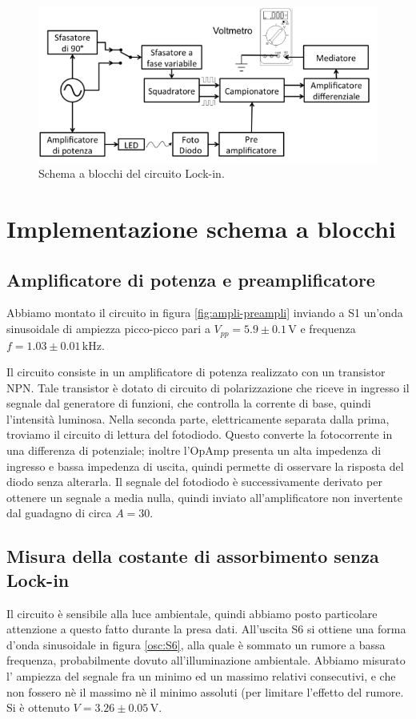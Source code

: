 \documentclass[10pt,a4paper]{article}
\begin{document}
\begin{figure}[!htb]
  \centering
  \includegraphics[scale=0.75]{schemablocchi.png}
\caption{Schema a blocchi del circuito Lock-in.\label{fig:schemablocchi}}
\end{figure}


\section{Implementazione schema a blocchi}

\subsection{Amplificatore di potenza e preamplificatore}
Abbiamo montato il circuito in figura \ref{fig:ampli-preampli} inviando a S1 un'onda sinusoidale di ampiezza picco-picco pari a $V_{pp}= 5.9\pm0.1 \,\mbox{V}$ e frequenza $f=1.03\pm0.01\,\mbox{kHz}$. 

Il circuito consiste in un amplificatore di potenza realizzato con un transistor NPN. Tale transistor è
dotato di circuito di polarizzazione che riceve in ingresso il segnale dal generatore di funzioni, che controlla la corrente di base, quindi l'intensità luminosa. Nella seconda parte, elettricamente separata dalla prima, troviamo il  circuito di lettura del fotodiodo. Questo converte la fotocorrente in una differenza di potenziale; inoltre  l'OpAmp presenta un alta impedenza di ingresso e bassa impedenza di uscita, quindi permette di osservare la risposta del diodo senza alterarla.%
Il segnale del fotodiodo è successivamente derivato per ottenere un segnale a media nulla, quindi inviato all'amplificatore non invertente dal guadagno di circa $A = 30$.\\ 

\subsection{Misura della costante di assorbimento senza Lock-in}
Il circuito è sensibile alla luce ambientale, quindi abbiamo posto particolare attenzione a questo fatto durante la presa dati. %
All'uscita S6 si ottiene una forma d'onda sinusoidale in figura \ref{osc:S6}, alla quale è sommato un rumore a bassa frequenza, probabilmente dovuto all'illuminazione ambientale. Abbiamo misurato l' ampiezza del segnale fra un minimo ed un massimo relativi consecutivi, e che non fossero nè il massimo nè il minimo assoluti (per limitare l'effetto del rumore. Si è ottenuto $V=3.26\pm0.05\,\mbox{V}$.%
\end{document}
